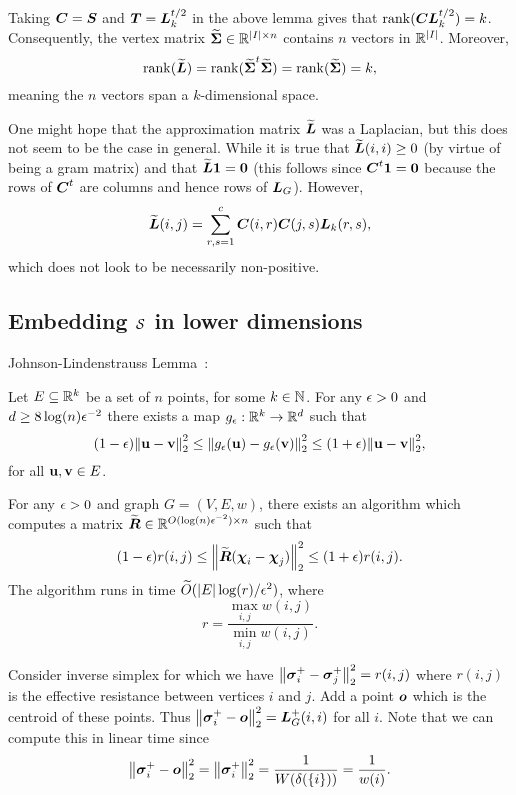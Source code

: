 Taking $\vb*{C}=\vb*{S}$ and $\vb*{T}=\vb*{L}_k^{t/2}$ in the above lemma gives that $\rank(\vb*{C}\vb*{L}_k^{t/2})=k$. Consequently, the vertex matrix $\widetilde{\boldsymbol{\Sigma}}\in\mathbb{R}^{|I|\times n}$ contains $n$ vectors in $\mathbb{R}^{|I|}$. Moreover, 
\[\rank(\widetilde{\vb*{L}}) = \rank(\widetilde{\boldsymbol{\Sigma}}^t \widetilde{\boldsymbol{\Sigma}}) = \rank(\widetilde{\boldsymbol{\Sigma}})=k,\]
meaning the $n$ vectors span a $k$-dimensional space. 

One might hope that the approximation matrix $\widetilde{\vb*{L}}$ was a Laplacian, but this does not seem to be the case in general. While it is true that $\widetilde{\vb*{L}}(i,i)\geq 0$ (by virtue of being a gram matrix) and that $\widetilde{\vb*{L}}\vb{1}=\vb{0}$ (this follows since $\vb*{C}^t\vb{1} =\vb{0}$ because the rows of $\vb*{C}^t$ are columns and hence rows of $\vb*{L}_G$). However, 
\[\widetilde{\vb*{L}}(i,j) = \sum_{r,s=1}^c \vb*{C}(i,r)\vb*{C}(j,s)\vb*{L}_k(r,s),\]
which does not look to be necessarily non-positive. 





\subsection{Embedding \texorpdfstring{$\mathcal{S}$}{the simplex} in lower dimensions}
Johnson-Lindenstrauss Lemma~\cite{johnson1984extensions,dasgupta2003elementary}: 

\begin{theorem}
Let $E\subseteq \mathbb{R}^k$ be a set of $n$ points, for some $k\in\mathbb{N}$. For any $\epsilon>0$ and $d\geq 8\log(n)\epsilon^{-2}$ there exists a map $g_\epsilon:\mathbb{R}^k\to\mathbb{R}^d$ such that 
\begin{equation*}
    (1-\epsilon)\norm{\vb{u}-\vb{v}}_2^2 \leq \norm{g_\epsilon(\vb{u}) - g_\epsilon(\vb{v})}_2^2 \leq (1+\epsilon)\norm{\vb{u}-\vb{v}}_2^2,
\end{equation*}
for all $\vb{u},\vb{v}\in E$. 
\end{theorem}

\begin{theorem}
For any $\epsilon>0$ and graph $G=(V,E,w)$, there exists an algorithm which computes a matrix $\widetilde{\vb*{R}}\in\mathbb{R}^{O(\log(n)\epsilon^{-2})\times n}$ such that 
\begin{equation*}
    (1-\epsilon)r(i,j) \leq \norm{\widetilde{\vb*{R}}(\boldsymbol{\chi}_i-\boldsymbol{\chi}_j)}_2^2 \leq (1+\epsilon) r(i,j).
\end{equation*}
The algorithm runs in time $\widetilde{O}( |E|\log (r)/\epsilon^2)$, where 
\[r=\frac{\max_{i,j}w(i,j)}{\min_{i,j}w(i,j)}.\]
\end{theorem}

Consider inverse simplex for which we have $\norm{\vb*{\sigma}_i^+-\vb*{\sigma}_j^+}_2^2=r(i,j)$ where $r(i,j)$ is the effective resistance between vertices $i$ and $j$. Add a point $\vb*{o}$ which is the centroid of these points. Thus $\norm{\vb*{\sigma}_i^+-\vb*{o}}_2^2 = \vb*{L}_G^+(i,i)$ for all $i$. Note that we can compute this in linear time since 
\[\norm{\vb*{\sigma}_i^+-\vb*{o}}_2^2 = \norm{\vb*{\sigma}_i^+}_2^2 = \frac{1}{W(\delta(\{i\}))}=\frac{1}{w(i)}.\]


